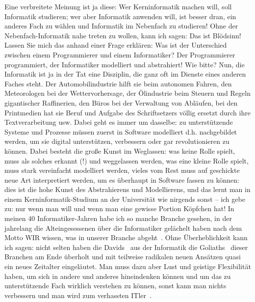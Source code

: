 {    

    Eine verbreitete Meinung ist ja diese: Wer Kerninformatik machen will, soll Informatik studieren; wer aber Informatik anwenden will, ist besser dran, ein anderes Fach zu wählen und Informatik im Nebenfach zu studieren! Ohne der Nebenfach-Informatik nahe treten zu wollen, kann ich sagen: Das ist Blödsinn! Lassen Sie mich das anhand einer Frage erklären: Was ist der Unterschied zwischen einem Programmierer und einem Informatiker? Der Programmierer programmiert, der Informatiker modelliert und abstrahiert! Wie bitte? Nun, die Informatik ist ja in der Tat eine Disziplin, die ganz oft im Dienste eines anderen Faches steht. Der Automobilindustrie hilft sie beim autonomen Fahren, den Meteorologen bei der Wettervorhersage, der Ölindustrie beim Steuern und Regeln gigantischer Raffinerien, den Büros bei der Verwaltung von Abläufen, bei den Printmedien hat sie Beruf und Aufgabe des Schriftsetzers völlig ersetzt durch ihre Textverarbeitung usw. Dabei geht es immer um dasselbe: zu unterstützende Systeme und Prozesse müssen zuerst in Software modelliert d.h. \glqq nachgebildet\grqq~ werden, um sie digital unterstützen, verbessern oder gar revolutionieren zu können. Dabei besteht die große Kunst im Weglassen: was keine Rolle spielt, muss als solches erkannt (!) und weggelassen werden, was eine kleine Rolle spielt, muss stark vereinfacht modelliert werden, vieles vom Rest muss auf geschickte neue Art interpretiert werden, um es überhaupt in Software fassen zu können: dies ist die hohe Kunst des Abstrahierens und Modellierens, und das lernt man in einem Kerninformatik-Studium an der Universität wie nirgends sonst -- ich gebe zu: nur wenn man will und wenn man eine gewisse Portion Köpfchen hat! In meinen 40 Informatiker-Jahren habe ich so manche Branche gesehen, in der jahrelang die Alteingesessenen über die Informatiker gelächelt haben nach dem Motto \glqq WIR wissen, was in unserer Branche abgeht\grqq~. Ohne Überheblichkeit kann ich sagen: nicht selten haben die \glqq Davids\grqq~ aus der Informatik die \glqq Goliaths\grqq~ dieser Branchen am Ende überholt und mit teilweise radikalen neuen Ansätzen quasi ein neues Zeitalter eingeläutet. Man muss dazu aber Lust und geistige Flexibilität haben, um sich in andere und anderes hineindenken können und um das zu unterstützende Fach wirklich verstehen zu können, sonst kann man nichts verbessern und man wird zum \glqq verhassten ITler\grqq~.

}
